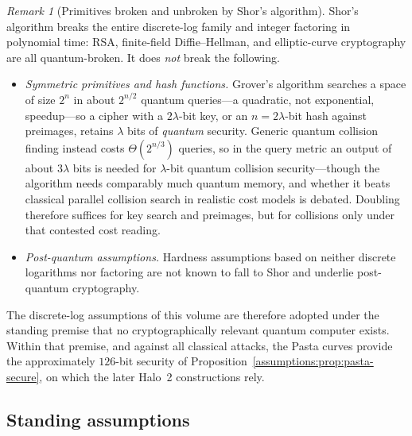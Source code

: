 \documentclass[11pt,a4paper]{article}
\theoremstyle{definition}
\theoremstyle{remark}
\newtheorem{remark}[theorem]{Remark}
\begin{document}
\begin{remark}[Primitives broken and unbroken by Shor's algorithm]
\label{assumptions:rem:shor-scope}
Shor's algorithm breaks the entire discrete-log family and integer
factoring in polynomial time: RSA, finite-field Diffie--Hellman, and
elliptic-curve cryptography are all quantum-broken. It does
\emph{not} break the following.
\begin{itemize}
\item \emph{Symmetric primitives and hash functions.} Grover's
  algorithm searches a space of size \(2^{n}\) in about \(2^{n/2}\)
  quantum queries---a quadratic, not exponential, speedup---so a
  cipher with a \(2\lambda\)-bit key, or an \(n = 2\lambda\)-bit hash
  against preimages, retains \(\lambda\) bits of \emph{quantum}
  security. Generic quantum collision finding instead costs
  \(\Theta(2^{n/3})\) queries, so in the query metric an output of
  about \(3\lambda\) bits is needed for \(\lambda\)-bit quantum
  collision security---though the algorithm needs comparably much
  quantum memory, and whether it beats classical parallel collision
  search in realistic cost models is debated. Doubling therefore
  suffices for key search and preimages, but for collisions only
  under that contested cost reading.
\item \emph{Post-quantum assumptions.} Hardness assumptions based on
  neither discrete logarithms nor factoring are not known to fall to
  Shor and underlie post-quantum cryptography.
\end{itemize}
The discrete-log assumptions of this volume are therefore adopted
under the standing premise that no cryptographically relevant quantum
computer exists. Within that premise, and against all classical
attacks, the Pasta curves provide the approximately \(126\)-bit
security of Proposition~\ref{assumptions:prop:pasta-secure}, on which
the later Halo~2 constructions rely.
\end{remark}

\subsection{Standing assumptions}
\label{assumptions:subsec:standing}
\end{document}

